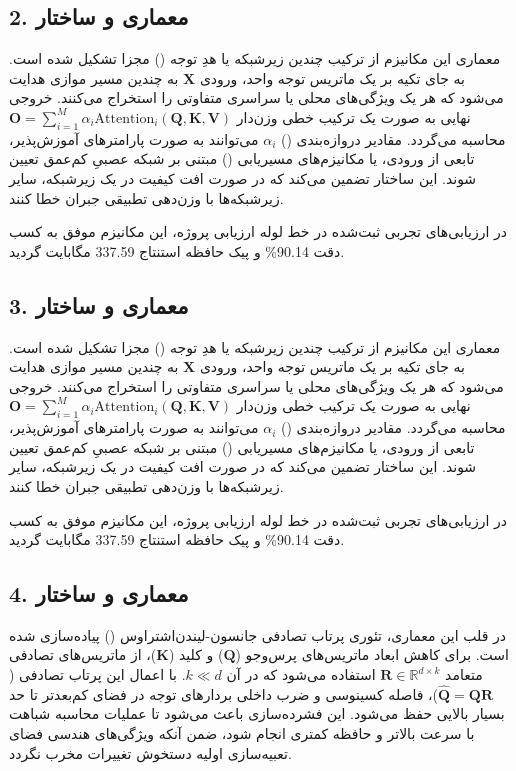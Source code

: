 \documentclass[12pt,a4paper]{report}
\theoremstyle{definition}
\begin{document}
\subsection*{2. معماری و ساختار }
معماری این مکانیزم از ترکیب چندین زیرشبکه یا هدِ توجه () مجزا تشکیل شده است. به جای تکیه بر یک ماتریس توجه واحد، ورودی $\mathbf{X}$ به چندین مسیر موازی هدایت می‌شود که هر یک ویژگی‌های محلی یا سراسری متفاوتی را استخراج می‌کنند. خروجی نهایی به صورت یک ترکیب خطی وزن‌دار $\mathbf{O} = \sum_{i=1}^{M} \alpha_i \mathrm{Attention}_i(\mathbf{Q}, \mathbf{K}, \mathbf{V})$ محاسبه می‌گردد. مقادیر دروازه‌بندی () $\alpha_i$ می‌توانند به صورت پارامترهای آموزش‌پذیر، تابعی از ورودی، یا مکانیزم‌های مسیریابی () مبتنی بر شبکه عصبیِ کم‌عمق تعیین شوند. این ساختار تضمین می‌کند که در صورت افت کیفیت در یک زیرشبکه، سایر زیرشبکه‌ها با وزن‌دهی تطبیقی جبران خطا کنند.

در ارزیابی‌های تجربی ثبت‌شده در خط لوله ارزیابی پروژه، این مکانیزم موفق به کسب دقت 90.14\% و پیک حافظه استنتاج 337.59 مگابایت گردید.

\subsection*{3. معماری و ساختار }
معماری این مکانیزم از ترکیب چندین زیرشبکه یا هدِ توجه () مجزا تشکیل شده است. به جای تکیه بر یک ماتریس توجه واحد، ورودی $\mathbf{X}$ به چندین مسیر موازی هدایت می‌شود که هر یک ویژگی‌های محلی یا سراسری متفاوتی را استخراج می‌کنند. خروجی نهایی به صورت یک ترکیب خطی وزن‌دار $\mathbf{O} = \sum_{i=1}^{M} \alpha_i \mathrm{Attention}_i(\mathbf{Q}, \mathbf{K}, \mathbf{V})$ محاسبه می‌گردد. مقادیر دروازه‌بندی () $\alpha_i$ می‌توانند به صورت پارامترهای آموزش‌پذیر، تابعی از ورودی، یا مکانیزم‌های مسیریابی () مبتنی بر شبکه عصبیِ کم‌عمق تعیین شوند. این ساختار تضمین می‌کند که در صورت افت کیفیت در یک زیرشبکه، سایر زیرشبکه‌ها با وزن‌دهی تطبیقی جبران خطا کنند.

در ارزیابی‌های تجربی ثبت‌شده در خط لوله ارزیابی پروژه، این مکانیزم موفق به کسب دقت 90.14\% و پیک حافظه استنتاج 337.59 مگابایت گردید.

\subsection*{4. معماری و ساختار }
در قلب این معماری، تئوری پرتاب تصادفی جانسون-لیندن‌اشتراوس () پیاده‌سازی شده است. برای کاهش ابعاد ماتریس‌های پرس‌وجو ($\mathbf{Q}$) و کلید ($\mathbf{K}$)، از ماتریس‌های تصادفی متعامد $\mathbf{R} \in \mathbb{R}^{d \times k}$ استفاده می‌شود که در آن $k \ll d$. با اعمال این پرتاب تصادفی ($\hat{\mathbf{Q}} = \mathbf{Q} \mathbf{R}$)، فاصله کسینوسی و ضرب داخلی بردارهای توجه در فضای کم‌بعدتر تا حد بسیار بالایی حفظ می‌شود. این فشرده‌سازی باعث می‌شود تا عملیات محاسبه شباهت با سرعت بالاتر و حافظه کمتری انجام شود، ضمن آنکه ویژگی‌های هندسی فضای تعبیه‌سازی اولیه دستخوش تغییرات مخرب نگردد.
\end{document}
